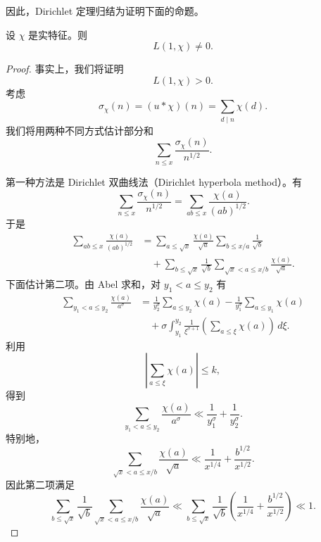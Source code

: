 因此，Dirichlet 定理归结为证明下面的命题。

\begin{proposition}
	设 $\chi$ 是实特征。则
	\[
		L(1,\chi)\neq0.
	\]
\end{proposition}

\begin{proof}
	事实上，我们将证明
	\[
		L(1,\chi)>0.
	\]
	考虑
	\[
		\sigma_\chi(n)=(u*\chi)(n)
		=
		\sum_{d\mid n}\chi(d).
	\]
	我们将用两种不同方式估计部分和
	\[
		\sum_{n\leq x}\frac{\sigma_\chi(n)}{n^{1/2}}.
	\]

	第一种方法是 Dirichlet 双曲线法（Dirichlet hyperbola method）。有
	\[
		\sum_{n\leq x}\frac{\sigma_\chi(n)}{n^{1/2}}
		=
		\sum_{ab\leq x}\frac{\chi(a)}{(ab)^{1/2}}.
	\]
	于是
	\[
\begin{aligned}
	\sum_{ab\leq x}\frac{\chi(a)}{(ab)^{1/2}}
	&=
	\sum_{a\leq\sqrt{x}}\frac{\chi(a)}{\sqrt{a}}
	\sum_{b\leq x/a}\frac{1}{\sqrt{b}}  \\
	&\quad+
	\sum_{b\leq\sqrt{x}}\frac{1}{\sqrt{b}}
	\sum_{\sqrt{x}<a\leq x/b}\frac{\chi(a)}{\sqrt{a}}.
\end{aligned}
	\]
	下面估计第二项。由 Abel 求和，对 $y_1<a\leq y_2$ 有
	\[
\begin{aligned}
	\sum_{y_1<a\leq y_2}\frac{\chi(a)}{a^\sigma}
	&=
	\frac{1}{y_2^\sigma}\sum_{a\leq y_2}\chi(a)
	-
	\frac{1}{y_1^\sigma}\sum_{a\leq y_1}\chi(a)  \\
	&\quad+
	\sigma\int_{y_1}^{y_2}
	\frac{1}{\xi^{\sigma+1}}
	\left(\sum_{a\leq \xi}\chi(a)\right)\,d\xi.
\end{aligned}
	\]
	利用
	\[
		\left|\sum_{a\leq \xi}\chi(a)\right|\leq k,
	\]
	得到
	\[
		\sum_{y_1<a\leq y_2}\frac{\chi(a)}{a^\sigma}
		\ll
		\frac{1}{y_1^\sigma}+\frac{1}{y_2^\sigma}.
	\]
	特别地，
	\[
		\sum_{\sqrt{x}<a\leq x/b}\frac{\chi(a)}{\sqrt{a}}
		\ll
		\frac{1}{x^{1/4}}+\frac{b^{1/2}}{x^{1/2}}.
	\]
	因此第二项满足
	\[
		\sum_{b\leq\sqrt{x}}\frac{1}{\sqrt{b}}
		\sum_{\sqrt{x}<a\leq x/b}\frac{\chi(a)}{\sqrt{a}}
		\ll
		\sum_{b\leq\sqrt{x}}\frac{1}{\sqrt{b}}
		\left(\frac{1}{x^{1/4}}+\frac{b^{1/2}}{x^{1/2}}\right)
		\ll 1.
	\]


\end{proof}
